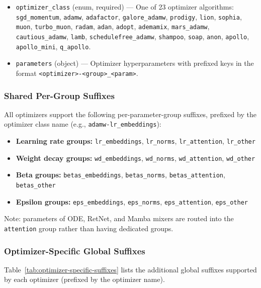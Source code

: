 \begin{itemize}[nosep]
    \item \texttt{optimizer\_class} (enum, required) --- One of 23 optimizer algorithms: \texttt{sgd\_momentum}, \texttt{adamw}, \texttt{adafactor}, \texttt{galore\_adamw}, \texttt{prodigy}, \texttt{lion}, \texttt{sophia}, \texttt{muon}, \texttt{turbo\_muon}, \texttt{radam}, \texttt{adan}, \texttt{adopt}, \texttt{ademamix}, \texttt{mars\_adamw}, \texttt{cautious\_adamw}, \texttt{lamb}, \texttt{schedulefree\_adamw}, \texttt{shampoo}, \texttt{soap}, \texttt{anon}, \texttt{apollo}, \texttt{apollo\_mini}, \texttt{q\_apollo}.
    \item \texttt{parameters} (object) --- Optimizer hyperparameters with prefixed keys in the format \texttt{<optimizer>-<group>\_<param>}.
\end{itemize}

\subsubsection{Shared Per-Group Suffixes}

All optimizers support the following per-parameter-group suffixes, prefixed by the optimizer class name (e.g., \texttt{adamw-lr\_embeddings}):

\begin{itemize}[nosep]
    \item \textbf{Learning rate groups:} \texttt{lr\_embeddings}, \texttt{lr\_norms}, \texttt{lr\_attention}, \texttt{lr\_other}
    \item \textbf{Weight decay groups:} \texttt{wd\_embeddings}, \texttt{wd\_norms}, \texttt{wd\_attention}, \texttt{wd\_other}
    \item \textbf{Beta groups:} \texttt{betas\_embeddings}, \texttt{betas\_norms}, \texttt{betas\_attention}, \texttt{betas\_other}
    \item \textbf{Epsilon groups:} \texttt{eps\_embeddings}, \texttt{eps\_norms}, \texttt{eps\_attention}, \texttt{eps\_other}
\end{itemize}

Note: parameters of ODE, RetNet, and Mamba mixers are routed into the \texttt{attention} group rather than having dedicated groups.

\subsubsection{Optimizer-Specific Global Suffixes}

Table~\ref{tab:optimizer-specific-suffixes} lists the additional global suffixes supported by each optimizer (prefixed by the optimizer name).

